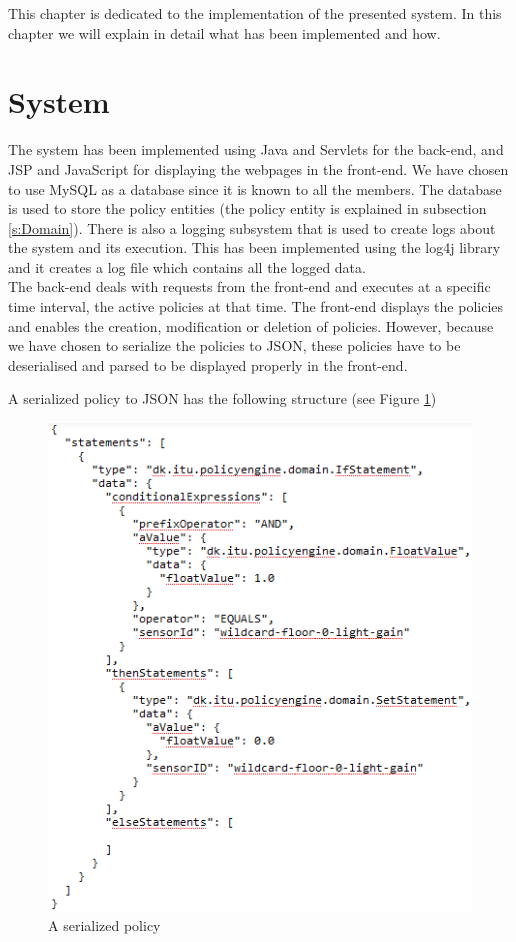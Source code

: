 This chapter is dedicated to the implementation of the presented system. In this chapter we will explain in detail what has been implemented and how. 

\section{System}
The system has been implemented using Java and Servlets for the back-end, and JSP and JavaScript for displaying the webpages in the front-end. We have chosen to use MySQL as a database since it is known to all the members. The database is used to store the policy entities (the policy entity is explained in subsection \ref{s:Domain}). There is also a logging subsystem that is used to create logs about the system and its execution. This has been implemented using the log4j library and it creates a log file which contains all the logged data. 
\\The back-end deals with requests from the front-end and executes at a specific time interval, the active policies at that time. The front-end displays the policies and enables the creation, modification or deletion of policies. However, because we have chosen to serialize the policies to JSON, these policies have to be deserialised and parsed to be displayed properly in the front-end. 

A serialized policy to JSON has the following structure (see Figure \ref{fig:json_policy})

\begin{figure}[ht]
	\centering
    \includegraphics[scale=0.85]{images/json_policy.png} 
	\caption{A serialized policy}
	\label{fig:json_policy}
\end{figure}

